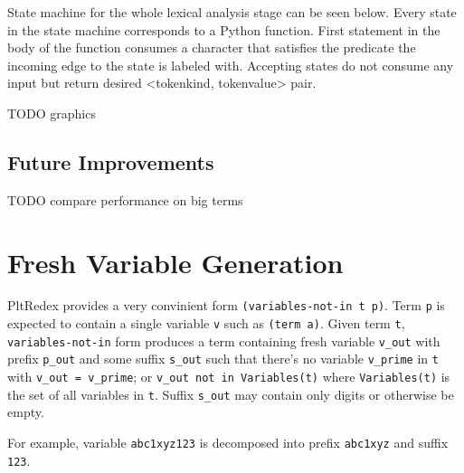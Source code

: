 State machine for the whole lexical analysis stage can be seen below. Every state in the state machine corresponds to a Python function. First statement in the body of the function consumes a character that satisfies the predicate the incoming edge to the state is labeled with. Accepting states do not consume any input but return desired <tokenkind, tokenvalue> pair.


TODO graphics


\subsection{Future Improvements}
TODO compare performance on big terms


\section{Fresh Variable Generation}
PltRedex provides a very convinient form \texttt{(variables-not-in t p)}. Term \texttt{p} is expected to contain a single variable \texttt{v} such as \texttt{(term a)}. Given term \texttt{t}, \texttt{variables-not-in} form produces a term containing fresh variable \texttt{v\_out} with prefix \texttt{p\_out} and some suffix \texttt{s\_out} such that there's no variable \texttt{v\_prime} in \texttt{t} with \texttt{v\_out = v\_prime}; or \texttt{v\_out not in Variables(t)} where \texttt{Variables(t)} is the set of all variables in \texttt{t}. Suffix \texttt{s\_out} may contain only digits or otherwise be empty. 

For example, variable \texttt{abc1xyz123} is decomposed into prefix \texttt{abc1xyz} and suffix \texttt{123}.

